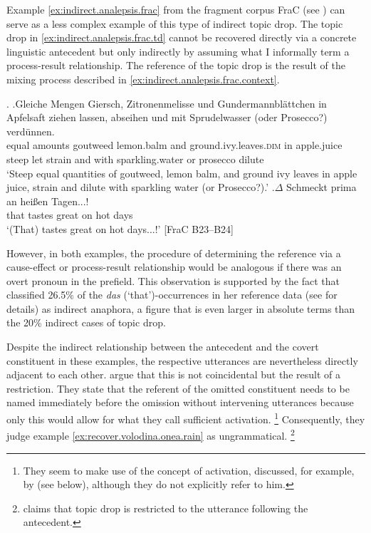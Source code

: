 \largerpage
Example \ref{ex:indirect.analepsis.frac} from the fragment corpus  FraC (see ) can serve as a less complex example of this type of indirect topic drop.
The topic drop in \ref{ex:indirect.analepsis.frac.td} cannot be recovered directly via a concrete linguistic antecedent but only indirectly by assuming what I informally term a process-result relationship.
The reference of the topic drop is the result of the mixing process described in \ref{ex:indirect.analepsis.frac.context}.

\ex.\label{ex:indirect.analepsis.frac}
\ag.\label{ex:indirect.analepsis.frac.context}Gleiche Mengen Giersch, Zitronenmelisse und Gundermannblättchen in Apfelsaft ziehen lassen, abseihen und mit Sprudelwasser (oder Prosecco?) verdünnen.\\
equal amounts goutweed lemon.balm and ground.ivy.leaves.\textsc{dim} in apple.juice steep let strain and with sparkling.water or prosecco dilute\\
`Steep equal quantities of goutweed, lemon balm, and ground ivy leaves in apple juice, strain and dilute with sparkling water (or Prosecco?).'
\bg.\label{ex:indirect.analepsis.frac.td}$\Delta$ Schmeckt prima an heißen Tagen...! \\
that tastes great on hot days\\
`(That) tastes great on hot days...!' [FraC B23--B24]

However, in both examples, the procedure of determining the reference via a cause-effect or process-result relationship would be analogous if there was an overt pronoun in the prefield.
This observation is supported by the fact that \citet[211]{helmer2016} classified 26.5\% of the \textit{das} (`that')-occurrences in her reference data (see  for details) as indirect anaphora, a figure that is even larger in absolute terms than the 20\% indirect cases of topic drop.

Despite the indirect relationship between the antecedent and the covert constituent in these examples, the respective utterances are nevertheless directly adjacent to each other.
\citet[217]{volodina.onea2012} argue that this is not coincidental but the result of a restriction.
They state that the referent of the omitted constituent needs to be named immediately before the omission without intervening utterances because only this would allow for what they call sufficient activation.%
\footnote{They seem to make use of the concept of activation, discussed, for example, by \citet{chafe1994} (see below), although they do not explicitly refer to him.}
%
Consequently, they judge example \ref{ex:recover.volodina.onea.rain} as ungrammatical.%
\footnote{\citet[299]{sandig2000} claims that topic drop is restricted to the utterance following the antecedent.}
%

